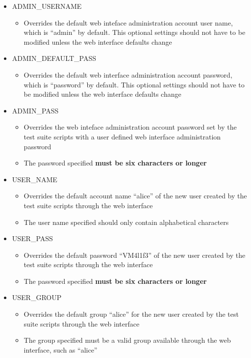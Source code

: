 \begin{itemize}
\item	ADMIN\_USERNAME
		\begin{itemize}
		\item	Overrides the default web inteface administration account user name,
				which is ``admin'' by default. This optional settings should not 
				have to be modified unless the \cernvm web interface defaults change
		\end{itemize}
		
\item	ADMIN\_DEFAULT\_PASS
		\begin{itemize}
		\item	Overrides the default web interface administration account password,
				which is ``password'' by default. This optional settings should not 
				have to be modified unless the \cernvm web interface defaults change
		\end{itemize}
		
\item	ADMIN\_PASS
		\begin{itemize}
		\item	Overrides the web inteface administration account password set by
				the test suite scripts with a user defined web interface
				administration password
		\item	The password specified {\bf must be six characters or longer}
		\end{itemize}

\item	USER\_NAME
		\begin{itemize}
		\item	Overrides the default account name ``alice'' of the new user created 
				by the test suite scripts through the web interface
		\item	The user name specified should only contain alphabetical characters
		\end{itemize}
		
\item	USER\_PASS
		\begin{itemize}
		\item	Overrides the default password ``VM4l1f3'' of the new user created 
				by the test suite scripts through the web interface
		\item	The password specified {\bf must be six characters or longer}
		\end{itemize}

\item	USER\_GROUP
		\begin{itemize}
		\item	Overrides the default group ``alice'' for the new user created 
				by the test suite scripts through the web interface
		\item	The group specified must be a valid group available
				through the web interface, such as ``alice''
		\end{itemize}


\end{itemize}
